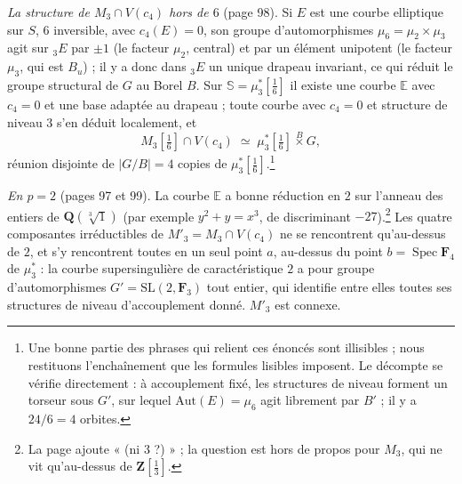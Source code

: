 \documentclass[11pt,a4paper]{article}
\begin{document}
\emph{La structure de $M_3 \cap V(c_4)$ hors de $6$} (page 98). Si $E$ est une
courbe elliptique sur $S$, $6$ inversible, avec $c_4(E) = 0$, son groupe
d'automorphismes $\mu_6 = \mu_2\times\mu_3$ agit sur ${}_3E$ par $\pm 1$ (le
facteur $\mu_2$, central) et par un élément unipotent (le facteur $\mu_3$, qui
est $B_u$) ; il y a donc dans ${}_3E$ un unique drapeau invariant, ce qui réduit
le groupe structural de $G$ au Borel $B$. Sur $\mathbb{S} =
\mu_3^{*}[\tfrac16]$ il existe une courbe $\mathbb{E}$ avec $c_4 = 0$ et une base
adaptée au drapeau ; toute courbe avec $c_4 = 0$ et structure de niveau $3$
s'en déduit localement, et
\[
M_3[\tfrac16] \cap V(c_4) \;\simeq\; \mu_3^{*}[\tfrac16] \overset{B}{\times} G,
\]
réunion disjointe de $|G/B| = 4$ copies de $\mu_3^{*}[\tfrac16]$.\footnote{Une
bonne partie des phrases qui relient ces énoncés sont illisibles ; nous
restituons l'enchaînement que les formules lisibles imposent. Le décompte se
vérifie directement : à accouplement fixé, les structures de niveau forment
un torseur sous $G'$, sur lequel $\mathrm{Aut}(E) = \mu_6$ agit librement
par $B'$ ; il y a $24/6 = 4$ orbites.}

\emph{En $p = 2$} (pages 97 et 99). La courbe $\mathbb{E}$ a bonne réduction en
$2$ sur l'anneau des entiers de $\mathbf{Q}(\sqrt[3]{1})$ (par exemple $y^2 + y
= x^3$, de discriminant $-27$).\footnote{La page ajoute « (ni 3 ?) » ; la
question est hors de propos pour $M_3$, qui ne vit qu'au-dessus de
$\mathbf{Z}[\tfrac13]$.} Les quatre composantes irréductibles de $M'_3 = M_3
\cap V(c_4)$ ne se rencontrent qu'au-dessus de $2$, et s'y rencontrent toutes
en un seul point $a$, au-dessus du point $b = \operatorname{Spec}\mathbf{F}_4$
de $\mu_3^{*}$ : la courbe supersingulière de caractéristique $2$ a pour
groupe d'automorphismes $G' = \mathrm{SL}(2,\mathbf{F}_3)$ tout entier, qui
identifie entre elles toutes ses structures de niveau d'accouplement donné.
$M'_3$ est connexe.
\end{document}
